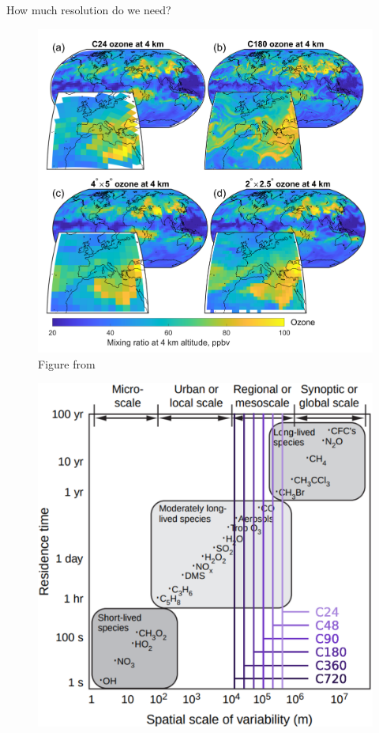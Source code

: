 \documentclass[10pt]{beamer}
\begin{document}
\begin{frame}[fragile]{How much resolution do we need?}
    \begin{minipage}[c]{0.5\textwidth}
        \begin{figure}
            \centering
            \includegraphics[width=\textwidth]{easthamp.png}
            \captionsetup{labelformat=empty}
            \caption{Figure from \cite{eastham_geos-chem_2018}}
        \end{figure}
    \end{minipage}
    \begin{minipage}[c]{0.49\textwidth}
        \begin{figure}
            \centering
            \includegraphics[width=\textwidth]{species-scale.eps}

\end{figure}
\end{minipage}
\end{frame}
\end{document}

